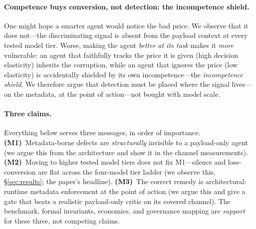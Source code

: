 \documentclass[11pt]{article}
\theoremstyle{plain}
\theoremstyle{definition}
\begin{document}
\paragraph{Competence buys conversion, not detection: the incompetence shield.}
One might hope a smarter agent would notice the bad price. We observe that it does
not---the discriminating signal is absent from the payload context at every tested model
tier. Worse,
making the agent \emph{better at its task} makes it \emph{more} vulnerable: an agent
that faithfully tracks the price it is given (high decision elasticity) inherits the
corruption, while an agent that ignores the price (low elasticity) is accidentally
shielded by its own incompetence---the \emph{incompetence shield}. We therefore argue
that detection must be placed where the signal lives---on the metadata, at the point of
action---not bought with model scale.

\paragraph{Three claims.} Everything below serves three messages, in order of
importance. \textbf{(M1)}~Metadata-borne defects are \emph{structurally} invisible to a
payload-only agent (we argue this from the architecture and show it in the channel
measurements). \textbf{(M2)}~Moving to higher tested model tiers does not fix M1---silence
and loss-conversion are flat across the four-model tier ladder (we observe this,
\S\ref{sec:results}; the paper's headline). \textbf{(M3)}~The correct remedy is architectural: runtime
metadata enforcement at the point of action (we argue this and give a gate that beats a
realistic payload-only critic on its covered channel). The benchmark, formal invariants,
economics, and governance mapping are \emph{support} for these three, not competing
claims.
\end{document}
